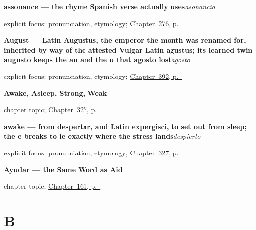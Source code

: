 \noindent\begin{minipage}[t]{\linewidth}
\raggedright
\textbf{assonance — the rhyme Spanish verse actually uses}\enspace\emph{asonancia}\par
\footnotesize explicit focus: pronunciation, etymology; \hyperref[ch:literario]{Chapter~276, p.~\pageref*{ch:literario}}
\end{minipage}\par\smallskip

\noindent\begin{minipage}[t]{\linewidth}
\raggedright
\textbf{August — Latin Augustus, the emperor the month was renamed for, inherited by way of the attested Vulgar Latin agustus; its learned twin augusto keeps the au and the u that agosto lost}\enspace\emph{agosto}\par
\footnotesize explicit focus: pronunciation, etymology; \hyperref[ch:el-aeropuerto-y-las-vacaciones]{Chapter~392, p.~\pageref*{ch:el-aeropuerto-y-las-vacaciones}}
\end{minipage}\par\smallskip

\noindent\begin{minipage}[t]{\linewidth}
\raggedright
\textbf{Awake, Asleep, Strong, Weak}\par
\footnotesize chapter topic; \hyperref[ch:despierto-y-sano]{Chapter~327, p.~\pageref*{ch:despierto-y-sano}}
\end{minipage}\par\smallskip

\noindent\begin{minipage}[t]{\linewidth}
\raggedright
\textbf{awake — from despertar, and Latin expergisci, to set out from sleep; the e breaks to ie exactly where the stress lands}\enspace\emph{despierto}\par
\footnotesize explicit focus: pronunciation, etymology; \hyperref[ch:despierto-y-sano]{Chapter~327, p.~\pageref*{ch:despierto-y-sano}}
\end{minipage}\par\smallskip

\noindent\begin{minipage}[t]{\linewidth}
\raggedright
\textbf{Ayudar — the Same Word as Aid}\par
\footnotesize chapter topic; \hyperref[ch:spanish-ayudar]{Chapter~161, p.~\pageref*{ch:spanish-ayudar}}
\end{minipage}\par\smallskip

\section*{B}

